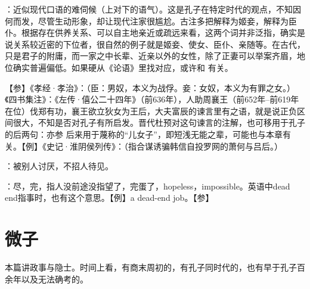 {
\item {}：近似现代口语的难伺候（上对下的语气）。这是孔子在特定时代的观点，不知因何而发，尽管生动形象，却让现代注家很尴尬。古注多把解释为姬妾，解释为臣仆。根据存在供养关系、可以自主地亲近或疏远来看，这两个词并非泛指，确实是说关系较近密的下位者，很自然的例子就是姬妾、使女、臣仆、亲随等。在古代，只是君子的附庸，而一家之中长辈、近亲以外的女性，除了正妻可以举案齐眉，地位确实普遍偏低。如果硬从《论语》里找对应，或许和  有关。

【参】《孝经·孝治》：（臣：男奴，本义为战俘。妾：女奴，本义为有罪之女。）《四书集注》：《左传·僖公二十四年》（前636年），人助周襄王（前652年--前619年在位）伐郑有功，襄王欲立狄女为王后，大夫富辰的谏言里有之语，就是说正负区间很大，不知是否对孔子有所启发。晋代杜预对这句谏言的注解，也可移用于孔子的后两句：亦参  后来用于蔑称的“儿女子”，即短浅无能之辈，可能也与本章有关。【例】《史记·淮阴侯列传》：（指合谋诱骗韩信自投罗网的萧何与吕后。）
}
{}


{
\item {}：被别人讨厌，不招人待见。

\item {}：尽，完，指人没前途没指望了，完蛋了，hopeless，impossible。英语中dead end指事时，也有这个意思。【例】a dead-end job。【参】
}
{}



\chapter{微子}

本篇讲政事与隐士。时间上看，有商末周初的，有孔子同时代的，也有早于孔子百余年以及无法确考的。

